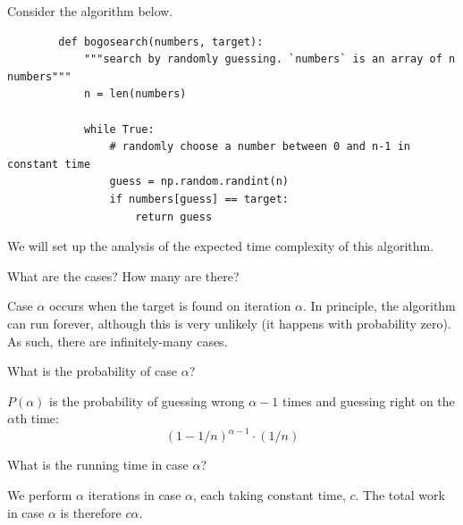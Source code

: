 \begin{prob}
    Consider the algorithm below.

    \begin{verbatim}
        def bogosearch(numbers, target):
            """search by randomly guessing. `numbers` is an array of n numbers"""
            n = len(numbers)

            while True:
                # randomly choose a number between 0 and n-1 in constant time
                guess = np.random.randint(n)
                if numbers[guess] == target:
                    return guess
    \end{verbatim}

    We will set up the analysis of the expected time complexity of this algorithm.

    \begin{subprobset}
        \begin{subprob}
            What are the cases? How many are there?

            \vspace{3em}

            \begin{soln}
                Case $\alpha$ occurs when the target is found on iteration $\alpha$.
                In principle, the algorithm can run forever, although this is very
                unlikely (it happens with probability zero). As such, there are
                infinitely-many cases.
            \end{soln}
        \end{subprob}

        \begin{subprob}
            What is the probability of case $\alpha$?

            \vspace{3em}

            \begin{soln}
                $P(\alpha)$ is the probability of guessing wrong $\alpha - 1$
                times and guessing right on the $\alpha$th time:
                \[
                    (1 - 1/n)^{\alpha - 1} \cdot (1/n)
                \]
            \end{soln}
        \end{subprob}

        \begin{subprob}
            What is the running time in case $\alpha$?

            \vspace{3em}

            \begin{soln}
                We perform $\alpha$ iterations in case $\alpha$, each taking
                constant time, $c$. The total work in case $\alpha$ is therefore
                $c \alpha$.
            \end{soln}
        \end{subprob}
    \end{subprobset}

\end{prob}
